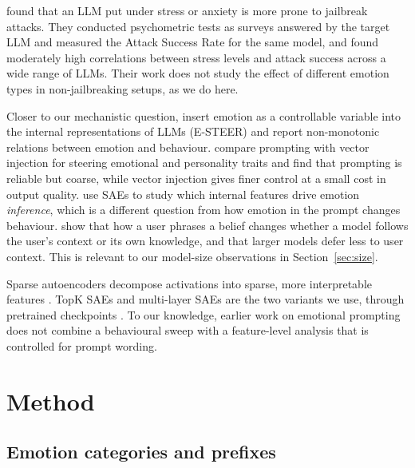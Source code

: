\documentclass[11pt]{article}
\begin{document}
\citet{kuznetsov2026freakout} found that an LLM put under stress or anxiety is more prone to jailbreak attacks. They conducted psychometric tests as surveys answered by the target LLM and measured the Attack Success Rate for the same model, and found moderately high correlations between stress levels and attack success across a wide range of LLMs. Their work does not study the effect of different emotion types in non-jailbreaking setups, as we do here.

Closer to our mechanistic question, \citet{sun2026emotion} insert emotion as a controllable variable into the internal representations of LLMs (E-STEER) and report non-monotonic relations between emotion and behaviour. \citet{banayeeanzade2026psyset} compare prompting with vector injection for steering emotional and personality traits and find that prompting is reliable but coarse, while vector injection gives finer control at a small cost in output quality. \citet{shu2026emotions} use SAEs to study which internal features drive emotion \emph{inference}, which is a different question from how emotion in the prompt changes behaviour. \citet{du2026belief} show that how a user phrases a belief changes whether a model follows the user's context or its own knowledge, and that larger models defer less to user context. This is relevant to our model-size observations in Section~\ref{sec:size}.

Sparse autoencoders decompose activations into sparse, more interpretable features \citep{cunningham2024sae,bricken2023monosemanticity}. TopK SAEs \citep{gao2025scaling} and multi-layer SAEs \citep{lawson2025mlsae} are the two variants we use, through pretrained checkpoints \citep{deng2026qwenscope}. To our knowledge, earlier work on emotional prompting does not combine a behavioural sweep with a feature-level analysis that is controlled for prompt wording.

\section{Method}

\subsection{Emotion categories and prefixes}
\label{sec:prompts}
\end{document}
